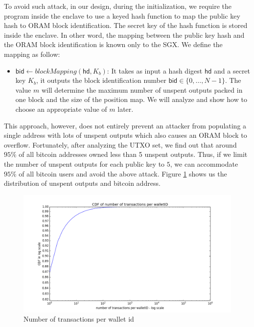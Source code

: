 To avoid such attack, in our design, during the initialization, we require the program inside the enclave to use a keyed hash function to map the public key hash to ORAM block identification. The secret key of the hash function is stored inside the enclave.  
In other word, the mapping between the public key hash and the ORAM block identification is known only to the SGX. 
We define the mapping as follow:
\begin{itemize}
	\item $\mathsf{bid}\leftarrow blockMapping(\mathsf{hd}, K_b)$: It takes as input a hash digest $\mathsf{hd}$ and a secret key $K_b$, it outputs the block identification number $\mathsf{bid}\in \{0,\dots,N-1\}$. The value $m$ will determine the maximum number of unspent outputs packed in one block and the size of the position map. We will analyze and show how to choose an appropriate value of $m$ later. 
\end{itemize}
This approach, however, does not entirely prevent an attacker from populating a single address with lots of unspent outputs which also causes an ORAM block to overflow.
Fortunately, after analyzing the UTXO set, we find out that around $95\%$ of all bitcoin addresses owned less than 5 unspent outputs. 
Thus, if we limit the number of unspent outputs for each public key to $5$, we can accommodate $95\%$ of all bitcoin users and avoid the above attack. 
Figure \ref{fig:utxo-analysis} shows us the distribution of unspent outputs and bitcoin address.
\begin{figure}[H]
	\centering
	\includegraphics[width=\linewidth]{fig/cdf.png}
	\caption{Number of transactions per wallet id}
	\label{fig:utxo-analysis}
\end{figure}

